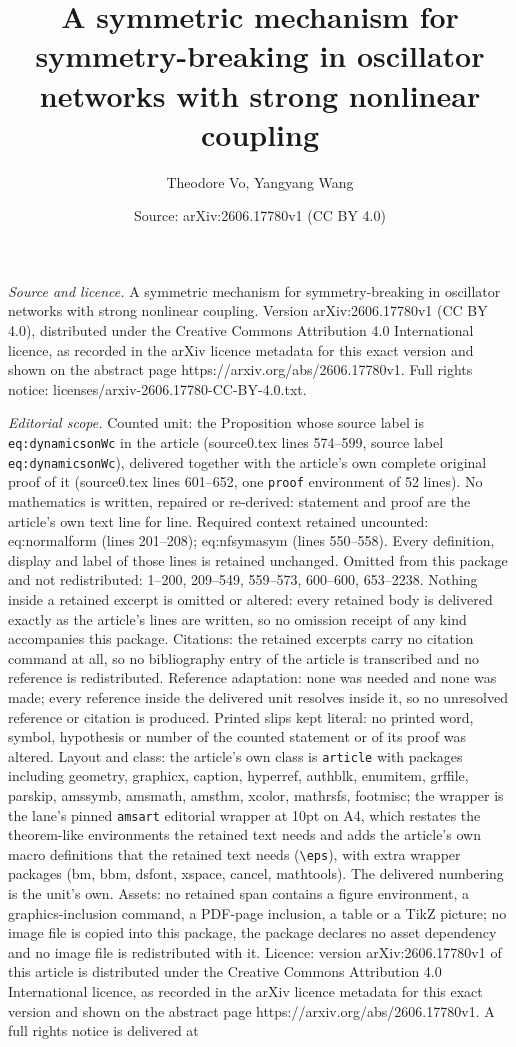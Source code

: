 \documentclass[10pt,a4paper]{amsart}
\title[A symmetric mechanism for symmetry-breaking in oscillator ne]{A symmetric mechanism for symmetry-breaking in oscillator networks with strong nonlinear coupling}
\author{Theodore Vo, Yangyang Wang}
\date{Source: arXiv:2606.17780v1 (CC BY 4.0)}
\begin{document}
\maketitle

\noindent\emph{Source and licence.} A symmetric mechanism for symmetry-breaking in oscillator networks with strong nonlinear coupling. Version arXiv:2606.17780v1 (CC BY 4.0), distributed under the Creative Commons Attribution 4.0 International licence, as recorded in the arXiv licence metadata for this exact version and shown on the abstract page https://arxiv.org/abs/2606.17780v1. Full rights notice: licenses/arxiv-2606.17780-CC-BY-4.0.txt.\par\smallskip

\noindent\textit{Editorial scope.} Counted unit: the Proposition whose source label is \texttt{eq:dynamicsonWc} in the article (source0.tex lines 574--599, source label \texttt{eq:dynamicsonWc}), delivered together with the article's own complete original proof of it (source0.tex lines 601--652, one \texttt{proof} environment of 52 lines). No mathematics is written, repaired or re-derived: statement and proof are the article's own text line for line. Required context retained uncounted: eq:normalform (lines 201--208); eq:nfsymasym (lines 550--558). Every definition, display and label of those lines is retained unchanged. Omitted from this package and not redistributed: 1--200, 209--549, 559--573, 600--600, 653--2238. Nothing inside a retained excerpt is omitted or altered: every retained body is delivered exactly as the article's lines are written, so no omission receipt of any kind accompanies this package. Citations: the retained excerpts carry no citation command at all, so no bibliography entry of the article is transcribed and no reference is redistributed. Reference adaptation: none was needed and none was made; every reference inside the delivered unit resolves inside it, so no unresolved reference or citation is produced. Printed slips kept literal: no printed word, symbol, hypothesis or number of the counted statement or of its proof was altered. Layout and class: the article's own class is \texttt{article} with packages including geometry, graphicx, caption, hyperref, authblk, enumitem, grffile, parskip, amssymb, amsmath, amsthm, xcolor, mathrsfs, footmisc; the wrapper is the lane's pinned \texttt{amsart} editorial wrapper at 10pt on A4, which restates the theorem-like environments the retained text needs and adds the article's own macro definitions that the retained text needs (\texttt{\textbackslash eps}), with extra wrapper packages (bm, bbm, dsfont, xspace, cancel, mathtools). The delivered numbering is the unit's own. Assets: no retained span contains a figure environment, a graphics-inclusion command, a PDF-page inclusion, a table or a TikZ picture; no image file is copied into this package, the package declares no asset dependency and no image file is redistributed with it. Licence: version arXiv:2606.17780v1 of this article is distributed under the Creative Commons Attribution 4.0 International licence, as recorded in the arXiv licence metadata for this exact version and shown on the abstract page https://arxiv.org/abs/2606.17780v1. A full rights notice is delivered at 
\end{document}
